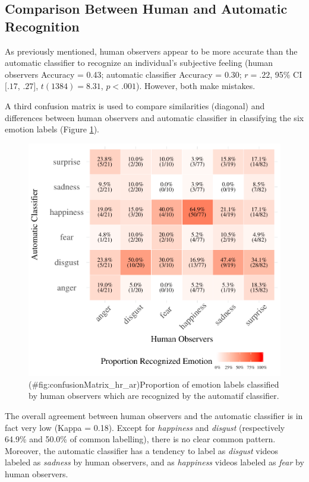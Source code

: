 \documentclass[man]{apa6}
\begin{document}
\hypertarget{comparison-between-human-and-automatic-recognition}{%
\subsection{Comparison Between Human and Automatic Recognition}\label{comparison-between-human-and-automatic-recognition}}

As previously mentioned, human observers appear to be more accurate than the automatic classifier to recognize an individual's subjective feeling (human observers Accuracy = 0.43; automatic classifier Accuracy = 0.30; \(r = .22\), 95\% CI \([.17\), \(.27]\), \(t(1384) = 8.31\), \(p < .001\)). However, both make mistakes.

A third confusion matrix is used to compare similarities (diagonal) and differences between human observers and automatic classifier in classifying the six emotion labels (Figure \ref{fig:confusionMatrix_hr_ar}).

\begin{figure}
\centering
\includegraphics{manuscript_apa_files/figure-latex/confusionMatrix_hr_ar-1.pdf}
\caption{(\#fig:confusionMatrix\_hr\_ar)\label{fig:confusionMatrix_hr_ar}Proportion of emotion labels classified by human observers which are recognized by the automatif classifier.}
\end{figure}

The overall agreement between human observers and the automatic classifier is in fact very low (Kappa = 0.18). Except for \emph{happiness} and \emph{disgust} (respectively 64.9\% and 50.0\% of common labelling), there is no clear common pattern. Moreover, the automatic classifier has a tendency to label as \emph{disgust} videos labeled as \emph{sadness} by human observers, and as \emph{happiness} videos labeled as \emph{fear} by human observers.
\end{document}
